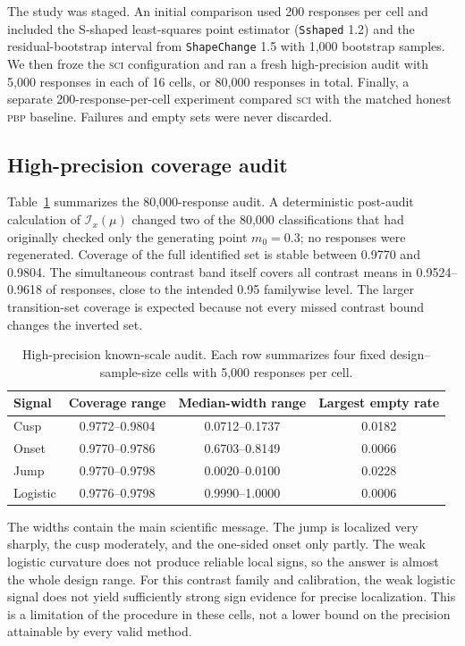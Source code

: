 \documentclass{interact}
\theoremstyle{definition}
\theoremstyle{remark}
\newcommand{\I}{\mathcal{I}}
\newcommand{\SCI}{\textnormal{\textsc{sci}}\xspace}
\newcommand{\PBP}{\textnormal{\textsc{pbp}}\xspace}
\begin{document}
The study was staged.  An initial comparison used 200 responses per cell and
included the S-shaped least-squares point estimator (\texttt{Sshaped} 1.2) and
the residual-bootstrap interval from \texttt{ShapeChange} 1.5 with 1,000
bootstrap samples.  We then froze the \SCI configuration and ran a fresh
high-precision audit with 5,000 responses in each of 16 cells, or 80,000
responses in total.  Finally, a separate 200-response-per-cell experiment
compared \SCI with the matched honest \PBP baseline.  Failures and empty sets
were never discarded.

\subsection{High-precision coverage audit}

Table~\ref{tab:e36} summarizes the 80,000-response audit.  A deterministic
post-audit calculation of $\I_x(\mu)$ changed two of the 80,000 classifications
that had originally checked only the generating point $m_0=0.3$; no responses
were regenerated.  Coverage of the full identified set is stable between
0.9770 and 0.9804.  The simultaneous contrast band itself covers all
contrast means in 0.9524--0.9618 of responses, close to the intended 0.95
familywise level.  The larger transition-set coverage is expected because not
every missed contrast bound changes the inverted set.

\begin{table}[htbp]
\centering
\caption{High-precision known-scale audit.  Each row summarizes four fixed
design--sample-size cells with 5,000 responses per cell.}
\label{tab:e36}
\small
\begin{tabular}{lccc}
\toprule
Signal & Coverage range & Median-width range & Largest empty rate\\
\midrule
Cusp     & 0.9772--0.9804 & 0.0712--0.1737 & 0.0182\\
Onset    & 0.9770--0.9786 & 0.6703--0.8149 & 0.0066\\
Jump     & 0.9770--0.9798 & 0.0020--0.0100 & 0.0228\\
Logistic & 0.9776--0.9798 & 0.9990--1.0000 & 0.0006\\
\bottomrule
\end{tabular}
\end{table}

The widths contain the main scientific message.  The jump is localized very
sharply, the cusp moderately, and the one-sided onset only partly.  The weak
logistic curvature does not produce reliable local signs, so the answer is
almost the whole design range.  For this contrast family and calibration,
the weak logistic signal does not yield sufficiently strong sign evidence for
precise localization.  This is a limitation of the procedure in these cells,
not a lower bound on the precision attainable by every valid method.
\end{document}
